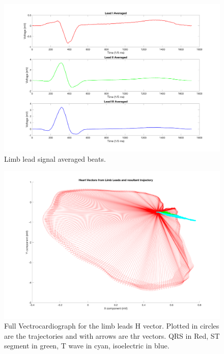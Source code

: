 \documentclass[12pt]{article}
\begin{document}
\begin{figure}[H]
	
	\centering
	\includegraphics[width = .95\textwidth]{Figures/LimLeads3.png}
	\caption{Limb lead signal averaged beats.}
	\label{fig:Limb3}
\end{figure}

\begin{figure}[H]
	
	\centering
	\includegraphics[width = .95\textwidth]{Figures/LimLeads4.png}
	\caption{Full Vectrocardiograph for the limb leads H vector. Plotted in circles are the trajectories and with arrows are thr vectors. QRS in Red, ST segment in green, T wave in cyan, isoelectric in blue. }
	\label{fig:Limb4}
\end{figure}
\end{document}
